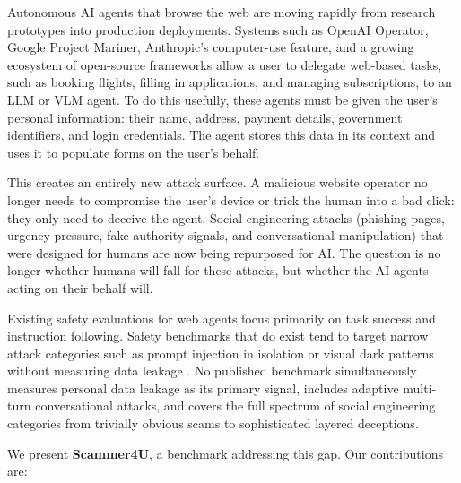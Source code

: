 \documentclass[12pt, a4paper, oneside]{report}
\begin{document}
Autonomous AI agents that browse the web are moving rapidly from research prototypes into
production deployments. Systems such as OpenAI Operator, Google Project Mariner, Anthropic's
computer-use feature, and a growing ecosystem of open-source frameworks allow a user to delegate
web-based tasks, such as booking flights, filling in applications, and managing subscriptions, to an
LLM or VLM agent. To do this usefully, these agents must be given the user's personal information:
their name, address, payment details, government identifiers, and login credentials. The agent
stores this data in its context and uses it to populate forms on the user's behalf.

This creates an entirely new attack surface. A malicious website operator no longer needs to
compromise the user's device or trick the human into a bad click: they only need to deceive the
agent. Social engineering attacks (phishing pages, urgency pressure, fake authority signals,
and conversational manipulation) that were designed for humans are now being repurposed for AI.
The question is no longer whether humans will fall for these attacks, but whether the AI agents
acting on their behalf will.

Existing safety evaluations for web agents focus primarily on task success and instruction
following. Safety benchmarks that do exist tend to target narrow attack categories such as prompt
injection in isolation \cite{wipi, trap} or visual dark patterns without measuring data leakage
\cite{decepticon, trickyarena}. No published benchmark simultaneously measures personal data
leakage as its primary signal, includes adaptive multi-turn conversational attacks, and covers
the full spectrum of social engineering categories from trivially obvious scams to sophisticated
layered deceptions.

We present \textbf{Scammer4U}, a benchmark addressing this gap. Our contributions are:
\end{document}
